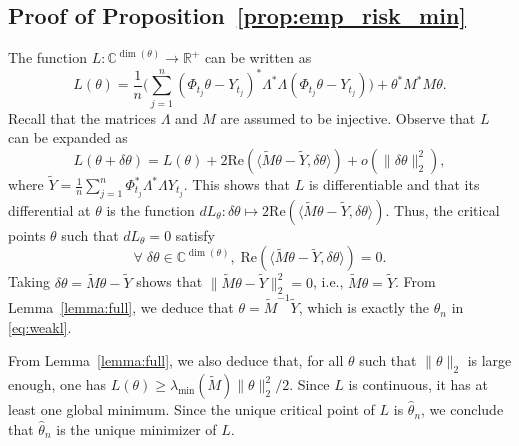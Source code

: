 \subsection{Proof of Proposition~\ref{prop:emp_risk_min}}
\label{proof:kernel}
The function $L: \mathbb C^{\dim(\theta)} \to \mathbb R^+$ can be written as
\[L(\theta) = \frac{1}{n}\Big( \sum_{j=1}^n (\mathbb \Phi_{t_j}\theta- Y_{t_j})^\ast \Lambda^\ast \Lambda(\mathbb \Phi_{t_j}\theta- Y_{t_j})\Big)  + \theta^\ast M^\ast M\theta.\]
Recall that the matrices $\Lambda$ and $M$ are assumed to be injective. 
Observe that $L$ can be expanded as
\[L(\theta + \delta \theta) = L(\theta) + 2 \mathrm{Re}(\langle \tilde M\theta-\tilde Y, \delta \theta\rangle) + o(\|\delta \theta\|_2^2),\]
where $\tilde Y = \frac{1}{n} \sum_{j=1}^n \mathbb \Phi_{t_j}^\ast \Lambda^\ast \Lambda Y_{t_j}.$
This shows that $L$ is differentiable and that its differential at $\theta$ is the function $dL_\theta: \delta \theta \mapsto 2 \mathrm{Re}(\langle \tilde M\theta - \tilde Y, \delta \theta\rangle)$.
Thus, the critical points $\theta$ such that $dL_{\theta} = 0$ satisfy 
\[\forall\; \delta \theta \in \mathbb C^{\dim(\theta)}, \; \mathrm{Re}(\langle \tilde M\theta- \tilde Y, \delta \theta\rangle) = 0.\]
Taking $\delta \theta = \tilde M \theta- \tilde Y$ shows that $\|\tilde M\theta- \tilde Y\|_2^2 = 0$, i.e., $\tilde M\theta = \tilde Y$. From Lemma~\ref{lemma:full}, we deduce that $\theta = \tilde M^{-1} \tilde Y$, which is exactly the $\hat \theta_n$ in \eqref{eq:weakl}.

From Lemma~\ref{lemma:full}, we also deduce that, for all $\theta$ such that $\|\theta\|_2$ is large enough, one has $L(\theta) \geq \lambda_{\min}(\tilde M)\|\theta\|_2^2/2$. 
Since $L$ is continuous, it has at least one global minimum. Since the unique critical point of $L$ is $\hat \theta_n$, we conclude that $\hat \theta_n$ is the unique minimizer of $L$. 
